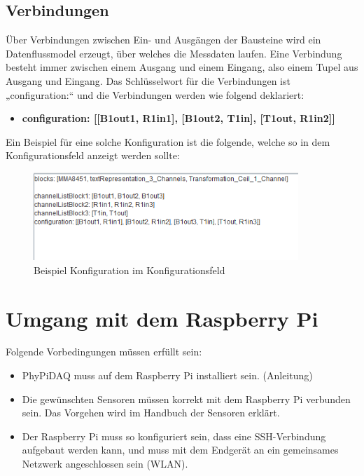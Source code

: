\documentclass[parskip=full]{scrartcl}
\begin{document}
\subsection{Verbindungen}

Über Verbindungen zwischen Ein- und Ausgängen der Bausteine wird ein Datenflussmodel erzeugt, über welches die Messdaten laufen.  Eine Verbindung besteht immer zwischen einem Ausgang und einem Eingang, also einem Tupel aus Ausgang und Eingang.   
Das Schlüsselwort für die Verbindungen ist „configuration:“ und die Verbindungen werden wie folgend deklariert:  

\begin{itemize}

\item[ ] \textbf{configuration: [[B1out1, R1in1], [B1out2, T1in], [T1out, R1in2]]}

\end{itemize}

Ein Beispiel für eine solche Konfiguration ist die folgende, welche so in dem Konfigurationsfeld anzeigt werden sollte:

\begin{figure}[htbp]
    \begin{center}
        \includegraphics[width = 10cm]{Grafiken/KonfigBsp.png}
        \caption{Beispiel Konfiguration im Konfigurationsfeld}
        \label{KonfigBsp}
    \end{center}
\end{figure}


\section{Umgang mit dem Raspberry Pi}

Folgende Vorbedingungen müssen erfüllt sein:

\begin{itemize}

\item PhyPiDAQ muss auf dem Raspberry Pi installiert sein. (Anleitung)

\item Die gewünschten Sensoren müssen korrekt mit dem Raspberry Pi verbunden sein. Das Vorgehen wird im Handbuch der Sensoren erklärt.

\item Der Raspberry Pi muss so konfiguriert sein, dass eine SSH-Verbindung aufgebaut werden kann, und muss mit dem Endgerät an ein gemeinsames Netzwerk angeschlossen sein (WLAN). 

\end{itemize}
\end{document}
